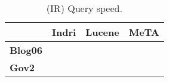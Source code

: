 \begin{table}[t]
\centering
{\small
\begin{tabular}{|l|r|r|r|}
    \hline & \textbf{Indri} & \textbf{Lucene} & \textbf{MeTA} \\
    \hline
    \textbf{Blog06} & & & \\
    \textbf{Gov2} & & & \\
    \hline
\end{tabular}
\caption{(IR) Query speed.}
}
\label{table:ir-query-speed}
\end{table}
